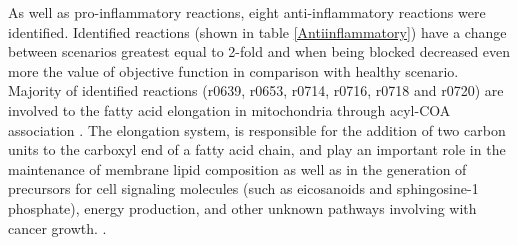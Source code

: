 As well as pro-inflammatory reactions, eight anti-inflammatory reactions were identified. Identified reactions (shown in table \ref{Antiinflammatory}) have a change between scenarios greatest equal to 2-fold and when being blocked decreased even more the value of objective function in comparison with healthy scenario. Majority of identified reactions (r0639, r0653, r0714, r0716, r0718 and r0720) are involved to the fatty acid elongation in mitochondria through acyl-COA association \cite{Landriscina1972}. The elongation system, is responsible for the addition of two carbon units to the carboxyl end of a fatty acid chain, and play an important role in the maintenance of membrane lipid composition as well as in the generation of precursors for cell signaling molecules (such as eicosanoids and sphingosine-1 phosphate), energy production, and other unknown pathways involving with cancer growth. \cite{Tamura2009}.

